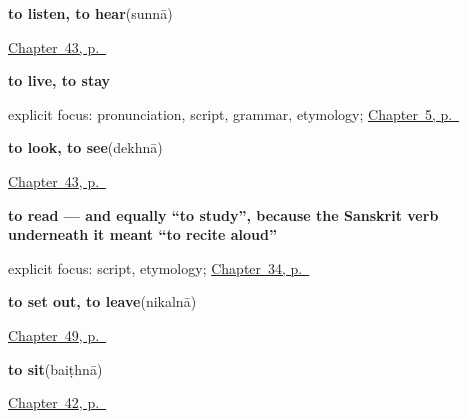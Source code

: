 \noindent\begin{minipage}[t]{\linewidth}
\raggedright
\textbf{to listen, to hear}\enspace\emph{}\enspace(sunnā)\par
\footnotesize \hyperref[ch:hi-see-say]{Chapter~43, p.~\pageref*{ch:hi-see-say}}
\end{minipage}\par\smallskip

\noindent\begin{minipage}[t]{\linewidth}
\raggedright
\textbf{to live, to stay}\enspace\emph{}\par
\footnotesize explicit focus: pronunciation, script, grammar, etymology; \hyperref[ch:first-verbs]{Chapter~5, p.~\pageref*{ch:first-verbs}}
\end{minipage}\par\smallskip

\noindent\begin{minipage}[t]{\linewidth}
\raggedright
\textbf{to look, to see}\enspace\emph{}\enspace(dekhnā)\par
\footnotesize \hyperref[ch:hi-see-say]{Chapter~43, p.~\pageref*{ch:hi-see-say}}
\end{minipage}\par\smallskip

\noindent\begin{minipage}[t]{\linewidth}
\raggedright
\textbf{to read — and equally \textquotedblleft{}to study\textquotedblright{}, because the Sanskrit verb underneath it meant \textquotedblleft{}to recite aloud\textquotedblright{}}\enspace\emph{}\par
\footnotesize explicit focus: script, etymology; \hyperref[ch:hi-verbs-of-the-mind]{Chapter~34, p.~\pageref*{ch:hi-verbs-of-the-mind}}
\end{minipage}\par\smallskip

\noindent\begin{minipage}[t]{\linewidth}
\raggedright
\textbf{to set out, to leave}\enspace\emph{}\enspace(nikalnā)\par
\footnotesize \hyperref[ch:hi-taking-leave]{Chapter~49, p.~\pageref*{ch:hi-taking-leave}}
\end{minipage}\par\smallskip

\noindent\begin{minipage}[t]{\linewidth}
\raggedright
\textbf{to sit}\enspace\emph{}\enspace(baiṭhnā)\par
\footnotesize \hyperref[ch:hi-more-verbs]{Chapter~42, p.~\pageref*{ch:hi-more-verbs}}
\end{minipage}\par\smallskip

